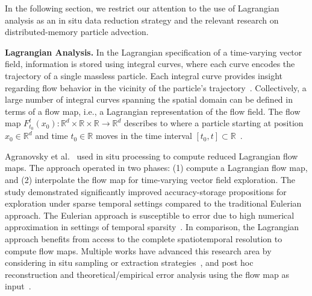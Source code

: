 In the following section, we restrict our attention to the use of Lagrangian analysis as an in situ data reduction strategy and the relevant research on distributed-memory particle advection.

\textbf{Lagrangian Analysis.}
%
In the Lagrangian specification of a time-varying vector field, information is stored using integral curves, where each curve encodes the trajectory of a single massless particle.
%
Each integral curve provides insight regarding flow behavior in the vicinity of the particle's trajectory~\cite{bujack2015lagrangian}.
%
Collectively, a large number of integral curves spanning the spatial domain can be defined in terms of a flow map, i.e., a Lagrangian representation of the flow field.
%
The flow map $F_{t_0}^{t}(x_0):\mathbb R^d \times \mathbb R \times \mathbb R  \to \mathbb R^d$ describes to where a particle starting at position $x_0\in \mathbb R^d$ and time $t_0\in \mathbb R$ moves in the time interval $[t_0,t]\subset \mathbb R$~\cite{garth2007efficient}.
%

Agranovsky et al.~\cite{agranovsky2014improved} used in situ processing to compute reduced Lagrangian flow maps. 
%
The approach operated in two phases: (1) compute a Lagrangian flow map, and (2) interpolate the flow map for time-varying vector field exploration.
%
The study demonstrated significantly improved accuracy-storage propositions for exploration under sparse temporal settings compared to the traditional Eulerian approach.
%
The Eulerian approach is susceptible to error due to high numerical approximation in settings of temporal sparsity~\cite{costa2004lagrangian,Qin2014,agranovsky2014improved,sane2018revisiting}. 
%
In comparison, the Lagrangian approach benefits from access to the complete spatiotemporal resolution to compute flow maps.
%
Multiple works have advanced this research area by considering in situ sampling or extraction strategies~\cite{sane2019interpolation, rapp2019void}, and post hoc reconstruction and theoretical/empirical error analysis using the flow map as input~\cite{hlawatsch2011hierarchical, bujack2015lagrangian, chandler2015interpolation, chandler2016analysis, hummel2016error, sane2018revisiting, sane2019interpolation, rapp2019void, jakob2020fluid}.

